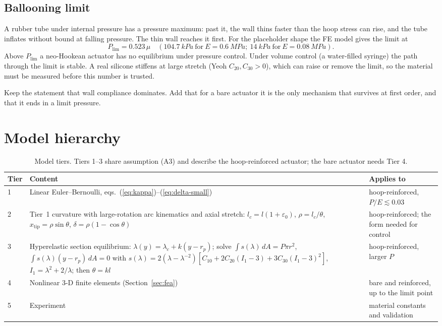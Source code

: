 \documentclass[11pt,a4paper]{article}
\numberwithin{equation}{section}
\newcommand{\rp}{r_p}
\begin{document}
\subsection{Ballooning limit}
A rubber tube under internal pressure has a pressure maximum: past it, the wall thins faster than the hoop stress can rise, and the tube inflates without bound at falling pressure.
The thin wall reaches it first. For the placeholder shape the FE model gives the limit at
\begin{equation}
P_{\text{lim}} = 0.523\,\mu \quad(\SI{104.7}{kPa}\ \text{for}\ E=\SI{0.6}{MPa};\ \SI{14}{kPa}\ \text{for}\ E=\SI{0.08}{MPa}).
\end{equation}
Above $P_{\text{lim}}$ a neo-Hookean actuator has no equilibrium under pressure control. Under volume control (a water-filled syringe) the path through the limit is stable.
A real silicone stiffens at large stretch (Yeoh $C_{20},C_{30}>0$), which can raise or remove the limit, so the material must be measured before this number is trusted.

\begin{correction}
Keep the statement that wall compliance dominates. Add that for a bare actuator it is the only mechanism that survives at first order, and that it ends in a limit pressure.
\end{correction}

\section{Model hierarchy}\label{sec:tiers}

\begin{table}[H]
\centering\small
\begin{tabularx}{\textwidth}{@{}l>{\raggedright\arraybackslash}X>{\raggedright\arraybackslash}X@{}}
\toprule
Tier & Content & Applies to\\
\midrule
1 & Linear Euler--Bernoulli, eqs.~(\ref{eq:kappa})--(\ref{eq:delta-small}) & hoop-reinforced, $P/E\lesssim 0.03$\\
2 & Tier~1 curvature with large-rotation arc kinematics and axial stretch: $l_c = l(1+\varepsilon_0)$, $\rho = l_c/\theta$, $x_{\text{tip}} = \rho\sin\theta$, $\delta=\rho(1-\cos\theta)$ & hoop-reinforced; the form needed for control\\
3 & Hyperelastic section equilibrium: $\lambda(y) = \lambda_c + k(y-\rp)$; solve $\int s(\lambda)\,dA = P\pi r^2$, $\int s(\lambda)(y-\rp)\,dA=0$ with $s(\lambda) = 2(\lambda-\lambda^{-2})[C_{10}+2C_{20}(I_1-3)+3C_{30}(I_1-3)^2]$, $I_1=\lambda^2+2/\lambda$; then $\theta = kl$ & hoop-reinforced, larger $P$\\
4 & Nonlinear 3-D finite elements (Section~\ref{sec:fea}) & bare and reinforced, up to the limit point\\
5 & Experiment & material constants and validation\\
\bottomrule
\end{tabularx}
\caption{Model tiers. Tiers 1--3 share assumption (A3) and describe the hoop-reinforced actuator; the bare actuator needs Tier 4.}
\end{table}
\end{document}
